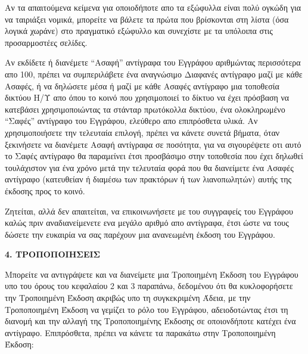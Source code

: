 Αν τα απαιτούμενα κείμενα για οποιοδήποτε απο τα εξώφυλλα είναι πολύ ογκώδη για να ταιριάξει νομικά, μπορείτε να βάλετε τα πρώτα που βρίσκονται στη λίστα (όσα λογικά χωράνε) στο πραγματικό εξώφυλλο και συνεχίστε με τα υπόλοιπα στις προσαρμοστέες σελίδες.

Αν εκδίδετε ή διανέμετε “Ασαφή” αντίγραφα του Εγγράφου αριθμώντας περισσότερα απο 100, πρέπει να συμπεριλάβετε ένα αναγνώσιμο Διαφανές αντίγραφο μαζί με κάθε Ασαφές, ή να δηλώσετε μέσα ή μαζί με κάθε Ασαφές αντίγραφο μια τοποθεσία δικτύου Η/Υ απο όπου το κοινό που χρησιμοποιεί το δίκτυο να έχει πρόσβαση να κατεβάσει χρησιμοποιώντας τα στάνταρ πρωτόκολλα δικτύου, ένα ολοκληρωμένο “Σαφές” αντίγραφο του Εγγράφου, ελεύθερο απο επιπρόσθετα υλικά. Αν χρησιμοποιήσετε την τελευταία επιλογή, πρέπει να κάνετε συνετά βήματα, όταν ξεκινήσετε να διανέμετε Ασαφή αντίγραφα σε ποσότητα, για να σιγουρέψετε οτι αυτό το Σαφές αντίγραφο θα παραμείνει έτσι προσβάσιμο στην τοποθεσία που έχει δηλωθεί τουλάχιστον για ένα χρόνο μετά την τελευταία φορά που θα διανείμετε ένα Ασαφές αντίγραφο (κατευθείαν ή διαμέσω των πρακτόρων ή των λιανοπωλητών) αυτής της έκδοσης προς το κοινό.

Ζητείται, αλλά δεν απαιτείται, να επικοινωνήσετε με του συγγραφείς του Εγγράφου καλώς πριν αναδιανείμενετε ενα μεγάλο αριθμό απο αντίγραφα, έτσι ώστε να τους δώσετε την ευκαιρία να σας παρέχουν μια ανανεωμένη έκδοση του Εγγράφου.


\begin{center}
{\Large\bf 4. ΤΡΟΠΟΠΟΙΗΣΕΙΣ\par}
\end{center}

Μπορείτε να αντιγράψετε και να διανείμετε μια Τροποιημένη Έκδοση του Εγγράφου υπο του όρους του κεφαλαίου 2 και 3 παραπάνω, δεδομένου ότι θα κυκλοφορήσετε την Τροποιημένη Έκδοση ακριβώς υπο τη συγκεκριμένη Άδεια, με την Τροποποιημένη Έκδοση να γεμίζει το ρόλο του Εγγράφου, αδειοδοτώντας έτσι τη διανομή και την αλλαγή της Τροποποιημένης Έκδοσης σε οποιονδήποτε κατέχει ένα αντίγραφο. Επιπρόσθετα, πρέπει να κάνετε τα παρακάτω στην Τροποποιημένη Έκδοση:

